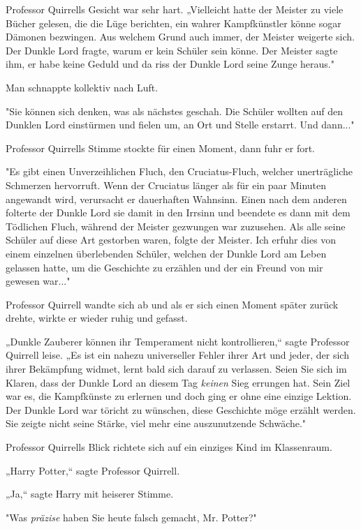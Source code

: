 {Professor Quirrells Gesicht war sehr hart. „Vielleicht hatte der Meister zu viele Bücher gelesen, die die Lüge berichten, ein wahrer Kampfkünstler könne sogar Dämonen bezwingen. Aus welchem Grund auch immer, der Meister weigerte sich. Der Dunkle Lord fragte, warum er kein Schüler sein könne. Der Meister sagte ihm, er habe keine Geduld und da riss der Dunkle Lord seine Zunge heraus."

Man schnappte kollektiv nach Luft.

"Sie können sich denken, was als nächstes geschah. Die Schüler wollten auf den Dunklen Lord einstürmen und fielen um, an Ort und Stelle erstarrt. Und dann..."

Professor Quirrells Stimme stockte für einen Moment, dann fuhr er fort.

"Es gibt einen Unverzeihlichen Fluch, den Cruciatus-Fluch, welcher unerträgliche Schmerzen hervorruft. Wenn der Cruciatus länger als für ein paar Minuten angewandt wird, verursacht er dauerhaften Wahnsinn. Einen nach dem anderen folterte der Dunkle Lord sie damit in den Irrsinn und beendete es dann mit dem Tödlichen Fluch, während der Meister gezwungen war zuzusehen. Als alle seine Schüler auf diese Art gestorben waren, folgte der Meister. Ich erfuhr dies von einem einzelnen überlebenden Schüler, welchen der Dunkle Lord am Leben gelassen hatte, um die Geschichte zu erzählen und der ein Freund von mir gewesen war..."

Professor Quirrell wandte sich ab und als er sich einen Moment später zurück drehte, wirkte er wieder ruhig und gefasst.

„Dunkle Zauberer können ihr Temperament nicht kontrollieren,“ sagte Professor Quirrell leise. „Es ist ein nahezu universeller Fehler ihrer Art und jeder, der sich ihrer Bekämpfung widmet, lernt bald sich darauf zu verlassen. Seien Sie sich im Klaren, dass der Dunkle Lord an diesem Tag \emph{keinen} Sieg errungen hat. Sein Ziel war es, die Kampfkünste zu erlernen und doch ging er ohne eine einzige Lektion. Der Dunkle Lord war töricht zu wünschen, diese Geschichte möge erzählt werden. Sie zeigte nicht seine Stärke, viel mehr eine auszunutzende Schwäche."

Professor Quirrells Blick richtete sich auf ein einziges Kind im Klassenraum.

„Harry Potter,“ sagte Professor Quirrell.

„Ja,“ sagte Harry mit heiserer Stimme.

"Was \emph{präzise} haben Sie heute falsch gemacht, Mr. Potter?"

}
